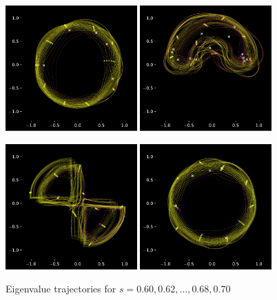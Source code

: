 \documentclass{article}
\begin{document}
	\newpage

	\begin{figure}[htbp]
		\centering
		\includegraphics[width=0.45\textwidth]{figures/N10Circle06to07.pdf}
		\includegraphics[width=0.45\textwidth]{figures/N10Meander06to07.pdf}

		\includegraphics[width=0.45\textwidth]{figures/N10Crossing06to07.pdf}
		\includegraphics[width=0.45\textwidth]{figures/N10Circle06to07B.pdf}
		\caption{Eigenvalue trajectories for $s= 0.60, 0.62, \dots , 0.68, 0.70$ }
		\label{fig:pdf_image}
	\end{figure}
\end{document}
